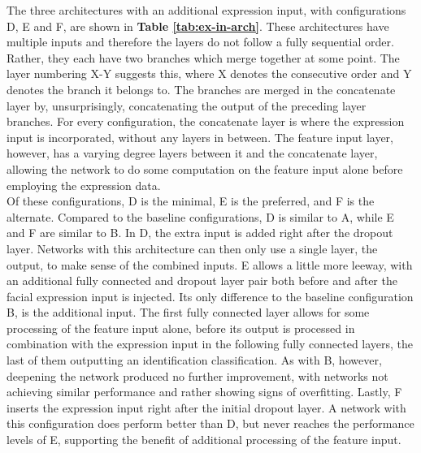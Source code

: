 
The three architectures with an additional expression input, with configurations D, E and F, are shown in \textbf{Table \ref{tab:ex-in-arch}}. These architectures have multiple inputs and therefore the layers do not follow a fully sequential order. Rather, they each have two branches which merge together at some point. The layer numbering X-Y suggests this, where X denotes the consecutive order and Y denotes the branch it belongs to. The branches are merged in the concatenate layer by, unsurprisingly, concatenating the output of the preceding layer branches. For every configuration, the concatenate layer is where the expression input is incorporated, without any layers in between. The feature input layer, however, has a varying degree layers between it and the concatenate layer, allowing the network to do some computation on the feature input alone before employing the expression data. \\

\noindent Of these configurations, D is the minimal, E is the preferred, and F is the alternate. Compared to the baseline configurations, D is similar to A, while E and F are similar to B. In D, the extra input is added right after the dropout layer. Networks with this architecture can then only use a single layer, the output, to make sense of the combined inputs. E allows a little more leeway, with an additional fully connected and dropout layer pair both before and after the facial expression input is injected. Its only difference to the baseline configuration B, is the additional input. The first fully connected layer allows for some processing of the feature input alone, before its output is processed in combination with the expression input in the following fully connected layers, the last of them outputting an identification classification. As with B, however, deepening the network produced no further improvement, with networks not achieving similar performance and rather showing signs of overfitting. Lastly, F inserts the expression input right after the initial dropout layer. A network with this configuration does perform better than D, but never reaches the performance levels of E, supporting the benefit of additional processing of the feature input. 

